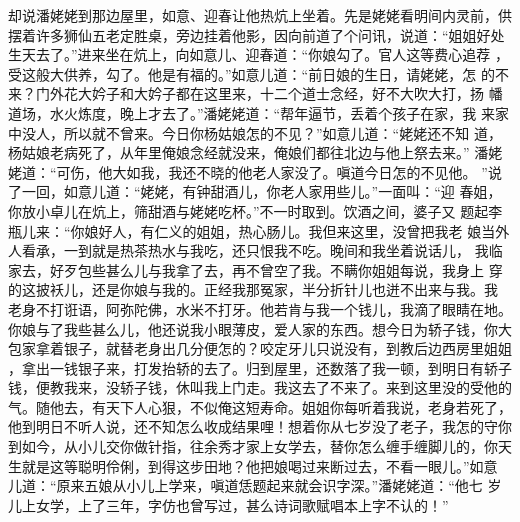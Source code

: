 却说潘姥姥到那边屋里，如意、迎春让他热炕上坐着。先是姥姥看明间内灵前，供
摆着许多狮仙五老定胜桌，旁边挂着他影，因向前道了个问讯，说道：“姐姐好处
生天去了。”进来坐在炕上，向如意儿、迎春道：“你娘勾了。官人这等费心追荐
，受这般大供养，勾了。他是有福的。”如意儿道：“前日娘的生日，请姥姥，怎
的不来？门外花大妗子和大妗子都在这里来，十二个道士念经，好不大吹大打，扬
幡道场，水火炼度，晚上才去了。”潘姥姥道：“帮年逼节，丢着个孩子在家，我
来家中没人，所以就不曾来。今日你杨姑娘怎的不见？”如意儿道：“姥姥还不知
道，杨姑娘老病死了，从年里俺娘念经就没来，俺娘们都往北边与他上祭去来。”
潘姥姥道：“可伤，他大如我，我还不晓的他老人家没了。嗔道今日怎的不见他。
”说了一回，如意儿道：“姥姥，有钟甜酒儿，你老人家用些儿。”一面叫：“迎
春姐，你放小卓儿在炕上，筛甜酒与姥姥吃杯。”不一时取到。饮酒之间，婆子又
题起李瓶儿来：“你娘好人，有仁义的姐姐，热心肠儿。我但来这里，没曾把我老
娘当外人看承，一到就是热茶热水与我吃，还只恨我不吃。晚间和我坐着说话儿，
我临家去，好歹包些甚么儿与我拿了去，再不曾空了我。不瞒你姐姐每说，我身上
穿的这披袄儿，还是你娘与我的。正经我那冤家，半分折针儿也迸不出来与我。我
老身不打诳语，阿弥陀佛，水米不打牙。他若肯与我一个钱儿，我滴了眼睛在地。
你娘与了我些甚么儿，他还说我小眼薄皮，爱人家的东西。想今日为轿子钱，你大
包家拿着银子，就替老身出几分便怎的？咬定牙儿只说没有，到教后边西房里姐姐
，拿出一钱银子来，打发抬轿的去了。归到屋里，还数落了我一顿，到明日有轿子
钱，便教我来，没轿子钱，休叫我上门走。我这去了不来了。来到这里没的受他的
气。随他去，有天下人心狠，不似俺这短寿命。姐姐你每听着我说，老身若死了，
他到明日不听人说，还不知怎么收成结果哩！想着你从七岁没了老子，我怎的守你
到如今，从小儿交你做针指，往余秀才家上女学去，替你怎么缠手缠脚儿的，你天
生就是这等聪明伶俐，到得这步田地？他把娘喝过来断过去，不看一眼儿。”如意
儿道：“原来五娘从小儿上学来，嗔道恁题起来就会识字深。”潘姥姥道：“他七
岁儿上女学，上了三年，字仿也曾写过，甚么诗词歌赋唱本上字不认的！”


